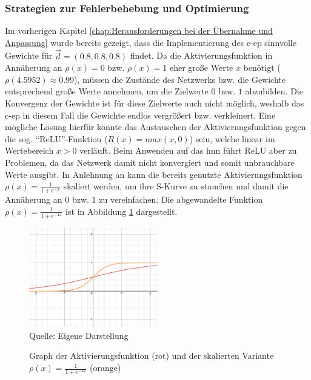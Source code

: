 \subsubsection{Strategien zur Fehlerbehebung und Optimierung}
\label{chap:Strategien zur Fehlerbehebung und Optimierung}

Im vorherigen Kapitel \ref{chap:Herausforderungen bei der Übernahme und Anpassung} wurde bereits gezeigt, dass die Implementierung des \ac{c-ep} sinnvolle Gewichte für \(\vec{d}=(0.8,0.8,0.8)\) findet. Da die Aktivierungsfunktion in Annäherung an \(\rho(x)=0\) bzw. \(\rho(x)=1\) eher große Werte \(x\) benötigt (\(\rho(4.5952)\approx0.99\)), müssen die Zustände des Netzwerks bzw. die Gewichte entsprechend große Werte annehmen, um die Zielwerte \(0\) bzw. \(1\) abzubilden. Die Konvergenz der Gewichte ist für diese Zielwerte auch nicht möglich, weshalb das \ac{c-ep} in diesem Fall die Gewichte endlos vergrößert bzw. verkleinert. Eine mögliche Lösung hierfür könnte das Austauschen der Aktivierungsfunktion gegen die sog. "`ReLU"'-Funktion (\(R(x)=max(x,0)\)) sein, welche linear im Wertebereich \(x>0\) verläuft. Beim Anwenden auf das \ac{hnn} führt ReLU aber zu Problemen, da das Netzwerk damit nicht konvergiert und somit unbrauchbare Werte ausgibt. In Anlehnung an \cite[vgl. S. 31]{Ernoult2020} kann die bereits genutzte Aktivierungsfunktion \(\rho(x)=\frac{1}{1+e^{-x}}\) skaliert werden, um ihre S-Kurve zu stauchen und damit die Annäherung an \(0\) bzw. \(1\) zu vereinfachen. Die abgewandelte Funktion \(\rho(x)=\frac{1}{1+e^{-4x}}\) ist in Abbildung \ref{fig:Graph der skalierten Aktivierungsfunktion} dargestellt.

\begin{figure}[h]
  \caption{Graph der Aktivierungsfunktion (rot) und der skalierten Variante \(\rho(x)=\frac{1}{1+e^{-4x}}\) (orange)}
  \includegraphics[width=0.5\textwidth]{abbildungen/sigmoid_funktion_skaliert.png}
  \\
  Quelle: Eigene Darstellung
  \label{fig:Graph der skalierten Aktivierungsfunktion}
\end{figure}


